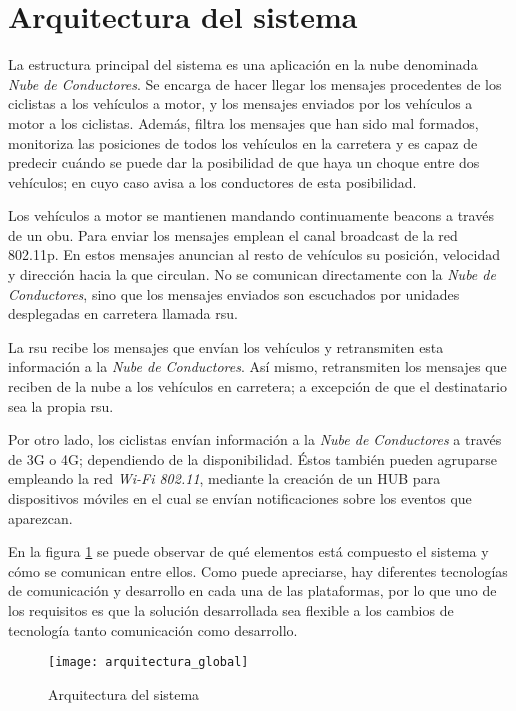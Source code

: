\section{Arquitectura del sistema}\label{section:arquitecturaSistema}
La estructura principal del sistema es una aplicación en la nube denominada \emph{Nube de Conductores}. Se encarga de hacer llegar los mensajes procedentes de los ciclistas a los vehículos a motor, y los mensajes enviados por los vehículos a motor a los ciclistas. Además, filtra los mensajes que han sido mal formados, monitoriza las posiciones de todos los vehículos en la carretera y es capaz de predecir cuándo se puede dar la posibilidad de que haya un choque entre dos vehículos; en cuyo caso avisa a los conductores de esta posibilidad.

Los vehículos a motor se mantienen mandando continuamente beacons a través de un \gls{obu}. Para enviar los mensajes emplean el canal broadcast de la red 802.11p. En estos mensajes anuncian al resto de vehículos su posición, velocidad y dirección hacia la que circulan. No se comunican directamente con la \emph{Nube de Conductores}, sino que los mensajes enviados son escuchados por unidades desplegadas en carretera llamada \gls{rsu}. 

La \gls{rsu} recibe los mensajes que envían los vehículos y retransmiten esta información a la \emph{Nube de Conductores}. Así mismo, retransmiten los mensajes que reciben de la nube a los vehículos en carretera; a excepción de que el destinatario sea la propia \gls{rsu}.

Por otro lado, los ciclistas envían información a la \emph{Nube de Conductores} a través de 3G o 4G; dependiendo de la disponibilidad. Éstos también pueden agruparse empleando la red \emph{Wi-Fi 802.11}, mediante la creación de un HUB para dispositivos móviles en el cual se envían notificaciones sobre los eventos que aparezcan.

En la figura \ref{fig:ArquitecturaSistema} se puede observar de qué elementos está compuesto el sistema y cómo se comunican entre ellos. Como puede apreciarse, hay diferentes tecnologías de comunicación y desarrollo en cada una de las plataformas, por lo que uno de los requisitos es que la solución desarrollada sea flexible a los cambios de tecnología tanto comunicación como desarrollo.

\begin{figure}[H]
	\begin{center}
		\texttt{[image: arquitectura\_global]}
		\caption{Arquitectura del sistema}
		\label{fig:ArquitecturaSistema}
	 \end{center}
\end{figure}
